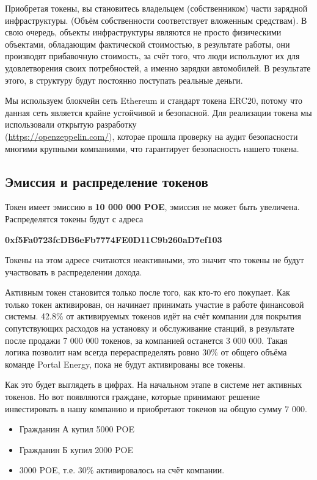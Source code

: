 \documentclass[a4paper,12pt]{report}
\begin{document}
Приобретая токены, вы становитесь владельцем (собственником) части зарядной инфраструктуры. (Объём собственности соответствует вложенным средствам). В свою очередь, объекты инфраструктуры являются не просто физическими объектами, обладающим фактической стоимостью, в результате работы, они производят прибавочную стоимость, за счёт того, что люди используют их для удовлетворения своих потребностей, а именно зарядки автомобилей. В результате этого, в структуру будут постоянно поступать реальные деньги.

Мы используем блокчейн сеть Ethereum и стандарт токена ERC20, потому что данная сеть является крайне устойчивой и безопасной.
Для реализации токена мы использовали открытую разработку \\ (\href{https://openzeppelin.com/}{https://openzeppelin.com/}), которае прошла проверку на аудит безопасности многими крупными компаниями, что гарантирует безопасность нашего токена.


\subsection{Эмиссия и распределение токенов}

Токен имеет эмиссию в \textbf{10 000 000 POE}, эмиссия не может быть увеличена. Распределятся токены будут с адреса 

\textbf{0xf5Fa0723fcDB6eFb7774FE0D11C9b260aD7ef103}

Токены на этом адресе считаются неактивными, это значит что токены не будут участвовать в распределении дохода.  

Активным токен становится только после того, как кто-то его покупает. Как только токен активирован, он начинает принимать участие в работе финансовой системы. 
42.8\% от активируемых токенов идёт на счёт компании для покрытия сопутствующих расходов на установку и обслуживание станций, в результате после продажи 7 000 000 токенов, за компанией останется 3 000 000. Такая логика позволит нам всегда перераспределять ровно 30\% от общего объёма команде Portal Energy, пока не будут активированы все токены.

Как это будет выглядеть в цифрах.
На начальном этапе в системе нет активных токенов. Но вот появляются граждане, которые принимают решение инвестировать в нашу компанию и приобретают токенов на общую сумму 7 000. 
\begin{itemize}
	\item Гражданин А купил 5000 POE
	\item Гражданин Б купил 2000 POE
	\item 3000 POE, т.е. 30\% активировалось на счёт компании.
\end{itemize}
\end{document}
